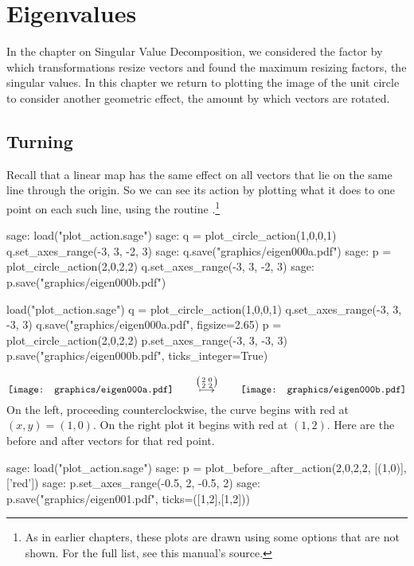 \chapter{Eigenvalues}

In the chapter on 
Singular Value Decomposition, we considered the factor by which 
transformations resize vectors and found
the maximum resizing factors, the singular values.
In this chapter we return to plotting the image of
the unit circle to consider another geometric effect,
the amount by which vectors are rotated.


\section{Turning}
Recall that a linear map has the same effect on 
all vectors that lie on the same line through the origin.
So we can see its
action by plotting what it does to one point on each such line,
using the routine .\footnote{%
  As in earlier chapters, these plots are drawn using some options that
  are not shown.
  For the full list, see this manual's source.}
\begin{sagecommandline}
sage: load("plot_action.sage")  
sage: q = plot_circle_action(1,0,0,1) 
q.set_axes_range(-3, 3, -2, 3) 
sage: q.save("graphics/eigen000a.pdf") 
sage: p = plot_circle_action(2,0,2,2) 
q.set_axes_range(-3, 3, -2, 3) 
sage: p.save("graphics/eigen000b.pdf")
\end{sagecommandline}
\begin{sagesilent}
load("plot_action.sage")  
q = plot_circle_action(1,0,0,1) 
q.set_axes_range(-3, 3, -3, 3) 
q.save("graphics/eigen000a.pdf", figsize=2.65)
p = plot_circle_action(2,0,2,2) 
p.set_axes_range(-3, 3, -3, 3) 
p.save("graphics/eigen000b.pdf", ticks_integer=True)
\end{sagesilent}
\begin{equation*} \label{gr:firstgraphic}
  \vcenteredhbox{\texttt{[image: graphics/eigen000a.pdf]}}
  \qquad\mapsunder{\big (\begin{smallmatrix} 2 &0 \\ 2 &2 \end{smallmatrix}\big )}\qquad
  \vcenteredhbox{\texttt{[image: graphics/eigen000b.pdf]}}
\end{equation*}
On the left, proceeding counterclockwise, 
the curve begins with red at $(x,y)=(1,0)$.
On the right plot it begins with red at $(1,2)$.
Here are the before and after vectors for that red point.
\begin{sagecommandline}
sage: load("plot_action.sage")  
sage: p = plot_before_after_action(2,0,2,2, [(1,0)], ['red']) 
sage: p.set_axes_range(-0.5, 2, -0.5, 2) 
sage: p.save("graphics/eigen001.pdf", ticks=([1,2],[1,2]))
\end{sagecommandline}
